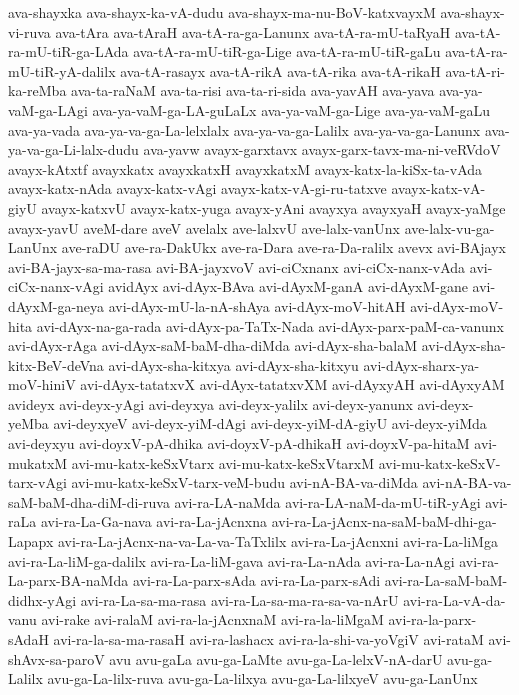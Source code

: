 {ava-shayxka
ava-shayx-ka-vA-dudu
ava-shayx-ma-nu-BoV-katxvayxM
ava-shayx-vi-ruva
ava-tAra
ava-tAraH
ava-tA-ra-ga-Lanunx
ava-tA-ra-mU-taRyaH
ava-tA-ra-mU-tiR-ga-LAda
ava-tA-ra-mU-tiR-ga-Lige
ava-tA-ra-mU-tiR-gaLu
ava-tA-ra-mU-tiR-yA-dalilx
ava-tA-rasayx
ava-tA-rikA
ava-tA-rika
ava-tA-rikaH
ava-tA-ri-ka-reMba
ava-ta-raNaM
ava-ta-risi
ava-ta-ri-sida
ava-yavAH
ava-yava
ava-ya-vaM-ga-LAgi
ava-ya-vaM-ga-LA-guLaLx
ava-ya-vaM-ga-Lige
ava-ya-vaM-gaLu
ava-ya-vada
ava-ya-va-ga-La-lelxlalx
ava-ya-va-ga-Lalilx
ava-ya-va-ga-Lanunx
ava-ya-va-ga-Li-lalx-dudu
ava-yavw
avayx-garxtavx
avayx-garx-tavx-ma-ni-veRVdoV
avayx-kAtxtf
avayxkatx
avayxkatxH
avayxkatxM
avayx-katx-la-kiSx-ta-vAda
avayx-katx-nAda
avayx-katx-vAgi
avayx-katx-vA-gi-ru-tatxve
avayx-katx-vA-giyU
avayx-katxvU
avayx-katx-yuga
avayx-yAni
avayxya
avayxyaH
avayx-yaMge
avayx-yavU
aveM-dare
aveV
avelalx
ave-lalxvU
ave-lalx-vanUnx
ave-lalx-vu-ga-LanUnx
ave-raDU
ave-ra-DakUkx
ave-ra-Dara
ave-ra-Da-ralilx
avevx
avi-BAjayx
avi-BA-jayx-sa-ma-rasa
avi-BA-jayxvoV
avi-ciCxnanx
avi-ciCx-nanx-vAda
avi-ciCx-nanx-vAgi
avidAyx
avi-dAyx-BAva
avi-dAyxM-ganA
avi-dAyxM-gane
avi-dAyxM-ga-neya
avi-dAyx-mU-la-nA-shAya
avi-dAyx-moV-hitAH
avi-dAyx-moV-hita
avi-dAyx-na-ga-rada
avi-dAyx-pa-TaTx-Nada
avi-dAyx-parx-paM-ca-vanunx
avi-dAyx-rAga
avi-dAyx-saM-baM-dha-diMda
avi-dAyx-sha-balaM
avi-dAyx-sha-kitx-BeV-deVna
avi-dAyx-sha-kitxya
avi-dAyx-sha-kitxyu
avi-dAyx-sharx-ya-moV-hiniV
avi-dAyx-tatatxvX
avi-dAyx-tatatxvXM
avi-dAyxyAH
avi-dAyxyAM
avideyx
avi-deyx-yAgi
avi-deyxya
avi-deyx-yalilx
avi-deyx-yanunx
avi-deyx-yeMba
avi-deyxyeV
avi-deyx-yiM-dAgi
avi-deyx-yiM-dA-giyU
avi-deyx-yiMda
avi-deyxyu
avi-doyxV-pA-dhika
avi-doyxV-pA-dhikaH
avi-doyxV-pa-hitaM
avi-mukatxM
avi-mu-katx-keSxVtarx
avi-mu-katx-keSxVtarxM
avi-mu-katx-keSxV-tarx-vAgi
avi-mu-katx-keSxV-tarx-veM-budu
avi-nA-BA-va-diMda
avi-nA-BA-va-saM-baM-dha-diM-di-ruva
avi-ra-LA-naMda
avi-ra-LA-naM-da-mU-tiR-yAgi
avi-raLa
avi-ra-La-Ga-nava
avi-ra-La-jAcnxna
avi-ra-La-jAcnx-na-saM-baM-dhi-ga-Lapapx
avi-ra-La-jAcnx-na-va-La-va-TaTxlilx
avi-ra-La-jAcnxni
avi-ra-La-liMga
avi-ra-La-liM-ga-dalilx
avi-ra-La-liM-gava
avi-ra-La-nAda
avi-ra-La-nAgi
avi-ra-La-parx-BA-naMda
avi-ra-La-parx-sAda
avi-ra-La-parx-sAdi
avi-ra-La-saM-baM-didhx-yAgi
avi-ra-La-sa-ma-rasa
avi-ra-La-sa-ma-ra-sa-va-nArU
avi-ra-La-vA-da-vanu
avi-rake
avi-ralaM
avi-ra-la-jAcnxnaM
avi-ra-la-liMgaM
avi-ra-la-parx-sAdaH
avi-ra-la-sa-ma-rasaH
avi-ra-lashacx
avi-ra-la-shi-va-yoVgiV
avi-rataM
avi-shAvx-sa-paroV
avu
avu-gaLa
avu-ga-LaMte
avu-ga-La-lelxV-nA-darU
avu-ga-Lalilx
avu-ga-La-lilx-ruva
avu-ga-La-lilxya
avu-ga-La-lilxyeV
avu-ga-LanUnx
}
